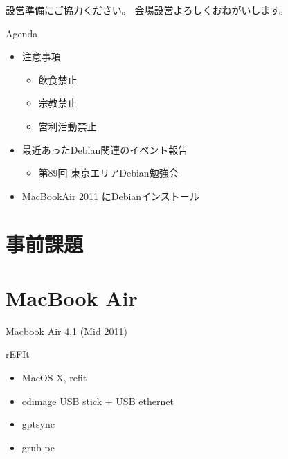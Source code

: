 \frame{\titlepage{}}

\begin{frame}{設営準備にご協力ください。}
会場設営よろしくおねがいします。
\end{frame}

\begin{frame}{Agenda}
\begin{minipage}[t]{0.45\hsize}
  \begin{itemize}
  \item 注意事項
	\begin{itemize}
	 \item 飲食禁止
	 \item 宗教禁止
	 \item 営利活動禁止
	\end{itemize}
   \item 最近あったDebian関連のイベント報告
	\begin{itemize}
        \item 第89回 東京エリアDebian勉強会
	\end{itemize}
 \end{itemize}
\end{minipage} 
\begin{minipage}[t]{0.45\hsize}
 \begin{itemize}
  \item MacBookAir 2011 にDebianインストール
 \end{itemize}
\end{minipage}
\end{frame}

\section{事前課題}
{\footnotesize
 
}

\section{MacBook Air}
\begin{frame}{}
 
Macbook Air 4,1 (Mid 2011)

\end{frame}

\begin{frame}{rEFIt}

\begin{itemize}
 \item MacOS X, refit
 \item cdimage USB stick + USB ethernet
 \item gptsync
 \item grub-pc
\end{itemize} 
\end{frame}

